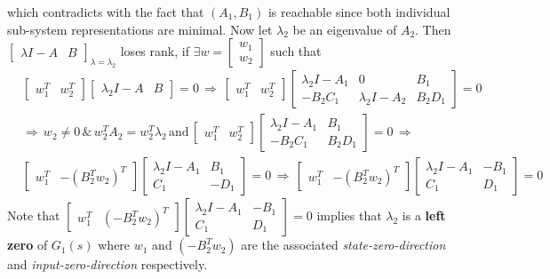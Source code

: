 \documentclass[twoside]{article}
\begin{document}
%
which contradicts with the fact that $(A_1,B_1)$ is reachable since both individual sub-system representations are minimal. 
Now let $\lambda_2$ be an eigenvalue of $A_2$.
Then $\left[ \begin{array}{c|c} \lambda I - A & B \end{array} \right]_{\lambda = \lambda_2}$ 
loses rank, if $\exists w = \begin{bmatrix} w_1 \\ w_2 \end{bmatrix}$ such that 
%
\begin{align*}
	&\begin{bmatrix} w_1^T & w_2^T \end{bmatrix} \left[ \begin{array}{c|c} \lambda_2 I - A & B \end{array} \right]
	= 0 \, \Rightarrow \, 
	\begin{bmatrix} w_1^T & w_2^T \end{bmatrix} \left[ \begin{array}{c|c|c} \lambda_2 I - A_1 & 0 & B_1 \\ \hline -B_2 C_1 & \lambda_2 I - A_2 & B_2 D_1 
	\end{array} \right] = 0
	\\
	&\Rightarrow \, w_2 \neq 0 \, \& \, w_2^T A_2 = w_2^T \lambda_2 
	\, \mathrm{and} \, \begin{bmatrix} w_1^T & w_2^T \end{bmatrix} \left[ \begin{array}{c|c} \lambda_2 I - A_1 & B_1 \\ \hline -B_2 C_1 & B_2 D_1 
	\end{array} \right] = 0 \, \Rightarrow \,
	\\
	&\begin{bmatrix} w_1^T & -(B_2^T w_2)^T \end{bmatrix} \left[ \begin{array}{c|c} \lambda_2 I - A_1 & B_1 \\ \hline C_1 & -D_1 
	\end{array} \right] = 0 \, \Rightarrow \,
	\begin{bmatrix} w_1^T & -(B_2^T w_2)^T \end{bmatrix} \left[ \begin{array}{c|c} \lambda_2 I - A_1 & -B_1 \\ \hline C_1 & D_1 
	\end{array} \right] = 0
\end{align*}
%
Note that $\begin{bmatrix} w_1^T & (-B_2^T w_2)^T \end{bmatrix} \left[ \begin{array}{c|c} \lambda_2 I - A_1 & -B_1 \\ \hline C_1 & D_1 
	\end{array} \right] = 0$
implies that $\lambda_2$ is a \textbf{left zero} of $G_1(s)$ where $w_1$ and $(-B_2^T w_2)$ 
are the associated \textit{state-zero-direction} and \textit{input-zero-direction} respectively. 
\end{document}
